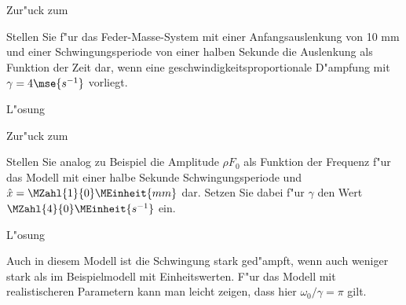 \begin{MExercises}
\begin{MExercise}
Zur"uck zum 
\end{MExercise}

\begin{MExercise}
Stellen Sie f"ur das Feder-Masse-System mit einer Anfangsauslenkung von 10 mm und einer Schwingungsperiode von einer halben Sekunde die Auslenkung als Funktion der Zeit dar, wenn eine geschwindigkeitsproportionale D"ampfung mit $\gamma = 4\mse{s^{-1}}$ vorliegt.

\begin{MHint}{L"osung} 
\begin{center}
  \end{center}


\end{MHint}

Zur"uck zum 
\end{MExercise}

\begin{MExercise}
Stellen Sie analog zu Beispiel  die Amplitude $\rho F_0$ als Funktion der Frequenz f"ur das Modell mit einer halbe Sekunde Schwingungsperiode und $\hat{x} = \MZahl{1}{0}\MEinheit{mm}$ dar. Setzen Sie dabei f"ur $\gamma$ den Wert $\MZahl{4}{0}\MEinheit{s^{-1}}$ ein.

\begin{MHint}{L"osung}
\begin{center}
  \end{center}
Auch in diesem Modell ist die Schwingung stark ged"ampft, wenn auch weniger stark als im Bei\-spiel\-mo\-dell mit Einheitswerten. F"ur das Modell mit realistischeren Parametern kann man leicht zeigen, dass hier $\omega_0/\gamma=\pi$ gilt.
\end{MHint}


\end{MExercise}
\end{MExercises}
